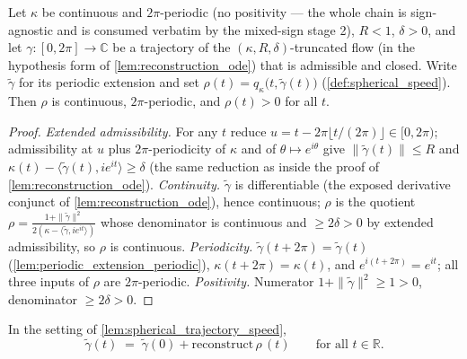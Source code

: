 \begin{lemma}
  \label{lem:spherical_trajectory_speed}
  Let $\kappa$ be continuous and $2\pi$-periodic (no positivity — the whole
  chain is sign-agnostic and is consumed verbatim by the mixed-sign stage 2),
  $R<1$, $\delta>0$, and let
  $\gamma:[0,2\pi]\to\mathbb C$ be a trajectory of the $(\kappa,R,\delta)$-truncated flow
  (in the hypothesis form of \cref{lem:reconstruction_ode}) that is admissible and
  closed. Write $\tilde\gamma$ for its periodic extension and set
  $\rho(t)=q_\kappa\bigl(t,\tilde\gamma(t)\bigr)$
  (\cref{def:spherical_speed}). Then $\rho$ is continuous, $2\pi$-periodic, and
  $\rho(t)>0$ for all $t$.
\end{lemma}

\begin{proof}
  \leanok
  \emph{Extended admissibility.} For any $t$ reduce $u=t-2\pi\lfloor t/(2\pi)\rfloor
  \in[0,2\pi)$; admissibility at $u$ plus $2\pi$-periodicity of $\kappa$ and of
  $\theta\mapsto e^{i\theta}$ give $\|\tilde\gamma(t)\|\le R$ and
  $\kappa(t)-\langle\tilde\gamma(t),ie^{it}\rangle\ge\delta$ (the same reduction as inside
  the proof of \cref{lem:reconstruction_ode}).
  \emph{Continuity.} $\tilde\gamma$ is differentiable (the exposed derivative conjunct of
  \cref{lem:reconstruction_ode}), hence continuous; $\rho$ is the quotient
  $\rho=\tfrac{1+\|\tilde\gamma\|^2}{2(\kappa-\langle\tilde\gamma,ie^{it}\rangle)}$ whose
  denominator is continuous and $\ge2\delta>0$ by extended admissibility, so $\rho$ is
  continuous.
  \emph{Periodicity.} $\tilde\gamma(t+2\pi)=\tilde\gamma(t)$
  (\cref{lem:periodic_extension_periodic}), $\kappa(t+2\pi)=\kappa(t)$, and
  $e^{i(t+2\pi)}=e^{it}$; all three inputs of $\rho$ are $2\pi$-periodic.
  \emph{Positivity.} Numerator $1+\|\tilde\gamma\|^2\ge1>0$, denominator $\ge2\delta>0$.
\end{proof}

\begin{lemma}
  \label{lem:spherical_trajectory_eq_reconstruct}
  In the setting of \cref{lem:spherical_trajectory_speed},
  \[
    \tilde\gamma(t)\;=\;\tilde\gamma(0)+\mathrm{reconstruct}\,\rho\,(t)
    \qquad\text{for all } t\in\mathbb R .
  \]
\end{lemma}

